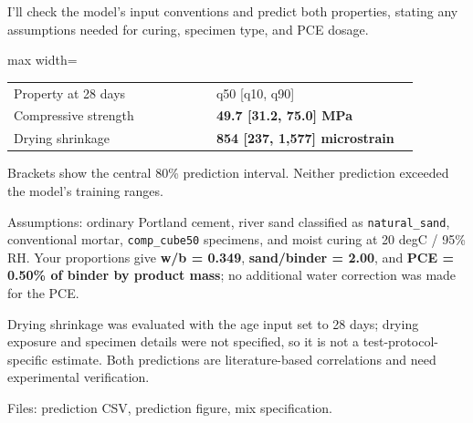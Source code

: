 \begin{agentbox}
I'll check the model's input conventions and predict both properties, stating any assumptions needed for curing, specimen type, and PCE dosage.\par
\par\smallskip\begin{adjustbox}{max width=\linewidth}\begin{tabular}{p{0.47\linewidth}p{0.47\linewidth}}
Property at 28 days & q50 [q10, q90] \\
Compressive strength & \textbf{49.7 [31.2, 75.0] MPa} \\
Drying shrinkage & \textbf{854 [237, 1,577] microstrain} \\
\end{tabular}\end{adjustbox}\par\smallskip
\par
Brackets show the central 80\% prediction interval. Neither prediction exceeded the model's training ranges.\par
\par
Assumptions: ordinary Portland cement, river sand classified as \texttt{natural\_sand}, conventional mortar, \texttt{comp\_cube50} specimens, and moist curing at 20  degC / 95\% RH. Your proportions give \textbf{w/b = 0.349}, \textbf{sand/binder = 2.00}, and \textbf{PCE = 0.50\% of binder by product mass}; no additional water correction was made for the PCE.\par
\par
Drying shrinkage was evaluated with the age input set to 28 days; drying exposure and specimen details were not specified, so it is not a test-protocol-specific estimate. Both predictions are literature-based correlations and need experimental verification.\par
\par
Files: prediction CSV, prediction figure, mix specification.\par
\par
\end{agentbox}